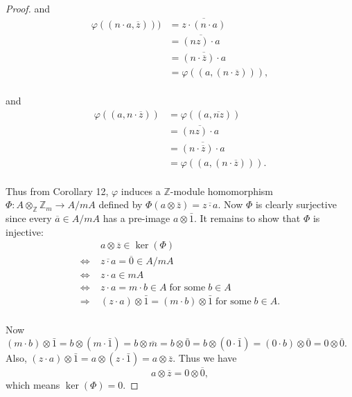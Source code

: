 \documentclass{article}
\begin{document}
\begin{enumerate}[label={(\alph*)}]
\begin{proof}
        and
        \begin{align*}
          \varphi((n\cdot a,\overline{z})))
          &=\overline{z\cdot (n\cdot a)}\\
          &=\overline{(nz)\cdot a}\\
          &=\overline{(n\cdot\overline{z})\cdot a}\\
          &=\varphi((a, (n\cdot \overline{z}))),\\
        \end{align*}

        and
        \begin{align*}
          \varphi((a,n\cdot\overline{z}))
          &=\varphi((a,\overline{nz}))\\
          &=\overline{(nz)\cdot a}\\
          &=\overline{(n\cdot\overline{z})\cdot a}\\
          &=\varphi((a, (n\cdot \overline{z}))).\\
        \end{align*}

        Thus from Corollary 12, $\varphi$ induces a $\mathbb{Z}$-module
        homomorphism $\Phi:A\otimes_\mathbb{Z}\mathbb{Z}_m \rightarrow
        A/mA$ defined by $\Phi(a\otimes\bar{z})=\overline{z\cdot a}$. Now
        $\Phi$ is clearly surjective since every $\overline{a}\in
        A/mA$ has a pre-image $a\otimes\bar{1}$. It remains to show that
        $\Phi$ is injective:
        \begin{align*}
          \;&a\otimes\overline{z}\in\ker(\Phi)\\
          \Leftrightarrow\;&\overline{z\cdot a}=\overline{0}\in A/mA\\
          \Leftrightarrow\;&z\cdot a\in mA\\
          \Leftrightarrow\;&z\cdot a =m\cdot b\in A\; \text{for some}\;
            b\in A\\
          \Rightarrow\;&(z\cdot a)\otimes\bar{1}=(m\cdot
            b)\otimes\bar{1}\; \text{for some}\; b\in A.\\
        \end{align*}

        Now $(m\cdot b)\otimes\bar{1} =b\otimes(m\cdot\bar{1})
        =b\otimes\overline{m} =b\otimes\bar{0} =b\otimes(0\cdot\bar{1})
        =(0\cdot b)\otimes\overline{0} =0\otimes\overline{0}$. Also,
        $(z\cdot a)\otimes\bar{1} =a\otimes(z\cdot\bar{1})
        =a\otimes\overline{z}$. Thus we have
        \[a\otimes\overline{z} =0\otimes\overline{0},\]
        which means $\ker(\Phi)=0$.
      \end{proof}


\end{enumerate}
\end{document}

